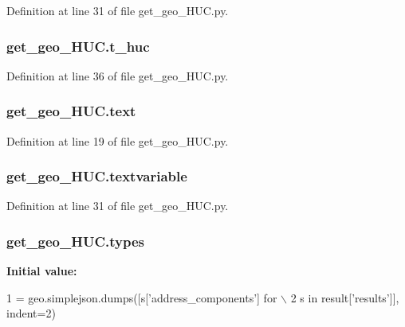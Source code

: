 Definition at line 31 of file get\+\_\+geo\+\_\+\+H\+U\+C.\+py.

\subsubsection[{\texorpdfstring{t\+\_\+huc}{t_huc}}]{\setlength{\rightskip}{0pt plus 5cm}get\+\_\+geo\+\_\+\+H\+U\+C.\+t\+\_\+huc}\hypertarget{namespaceget__geo___h_u_c_a0ac336639aa6dc23f2920f162311021b}{}\label{namespaceget__geo___h_u_c_a0ac336639aa6dc23f2920f162311021b}


Definition at line 36 of file get\+\_\+geo\+\_\+\+H\+U\+C.\+py.

\subsubsection[{\texorpdfstring{text}{text}}]{\setlength{\rightskip}{0pt plus 5cm}get\+\_\+geo\+\_\+\+H\+U\+C.\+text}\hypertarget{namespaceget__geo___h_u_c_ada77bf554a2fd51d028bc3830983b8b6}{}\label{namespaceget__geo___h_u_c_ada77bf554a2fd51d028bc3830983b8b6}


Definition at line 19 of file get\+\_\+geo\+\_\+\+H\+U\+C.\+py.

\subsubsection[{\texorpdfstring{textvariable}{textvariable}}]{\setlength{\rightskip}{0pt plus 5cm}get\+\_\+geo\+\_\+\+H\+U\+C.\+textvariable}\hypertarget{namespaceget__geo___h_u_c_ac67b3377ef85a8077485ef5ae2c64c59}{}\label{namespaceget__geo___h_u_c_ac67b3377ef85a8077485ef5ae2c64c59}


Definition at line 31 of file get\+\_\+geo\+\_\+\+H\+U\+C.\+py.

\subsubsection[{\texorpdfstring{types}{types}}]{\setlength{\rightskip}{0pt plus 5cm}get\+\_\+geo\+\_\+\+H\+U\+C.\+types}\hypertarget{namespaceget__geo___h_u_c_a55007b40146df8c34c3848a9944800d0}{}\label{namespaceget__geo___h_u_c_a55007b40146df8c34c3848a9944800d0}
{\bfseries Initial value\+:}
\begin{DoxyCode}
1 = geo.simplejson.dumps([s[\textcolor{stringliteral}{'address\_components'}] \textcolor{keywordflow}{for} \(\backslash\)
2                                       s \textcolor{keywordflow}{in} result[\textcolor{stringliteral}{'results'}]], indent=2)
\end{DoxyCode}


